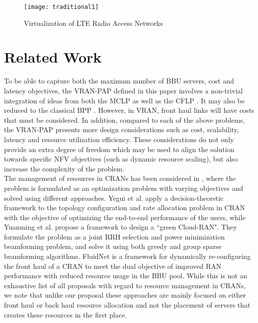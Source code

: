 \documentclass[conference]{IEEEtran}
\begin{document}
 \begin{figure}[t]
\centering
\texttt{[image: traditional1]}
  \caption{Virtualization of LTE Radio Access Networks}
  \label{current}
\end{figure}

\section{Related Work} \label{related}
To be able to capture both the maximum number of BBU servers, cost and latency objectives, the \ac{VRAN-PAP} defined in this paper involves a non-trivial integration of ideas from both the \ac{MCLP} \cite{MCLP74} as well as the \ac{CFLP} \cite{vygen2005approximation}. It may also be reduced to the classical \ac{BPP} \cite{Kenyon97}. However, in \ac{VRAN}, front haul links will have costs that must be considered. In addition, compared to each of the above problems, the \ac{VRAN-PAP} presents more design considerations such as cost, scalability, latency and resource utilization efficiency. These considerations do not only provide an extra degree of freedom which may be used to align the solution towards specific NFV objectives (such as dynamic resource scaling), but also increase the complexity of the problem.\\
\indent The management of resources in \acp{CRAN} has been considered in \cite{VuNguyen14, JianHua14}, where the problem is formulated as an optimization problem with varying objectives and solved using different approaches. Yegui et al. \cite{YeguiCia14} apply a decision-theoretic framework to the topology configuration and rate allocation problem in \ac{CRAN} with the objective of optimizing the end-to-end performance of the users, while Yuanming et al. \cite{Yuanming14} propose a framework to design a ``green Cloud-RAN". They formulate the problem as a joint \ac{RRH} selection and power minimization beamforming problem, and solve it using both greedy and group sparse beamforming algorithms. FluidNet \cite{Sundaresan135} is a framework for dynamically re-configuring the front haul of a \ac{CRAN} to meet the dual objective of improved \ac{RAN} performance with reduced resource usage in the BBU pool. While this is not an exhaustive list of all proposals with regard to resource management in \acp{CRAN}, we note that unlike our proposal these approaches are mainly focused on either front haul or back haul resource allocation and not the placement of servers that creates these resources in the first place.\\
\end{document}
